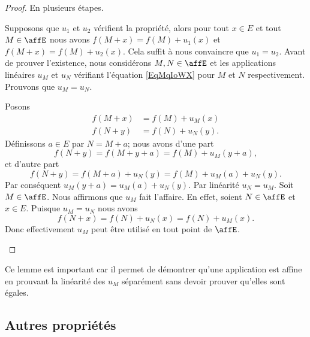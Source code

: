 \begin{proof}
	En plusieurs étapes.
	\begin{subproof}
		\spitem[Unicité]
		Supposons que \( u_1\) et \( u_2\) vérifient la propriété, alors pour tout \( x\in E\) et tout \( M\in \affE\) nous avons \( f(M+x)=f(M)+u_1(x)\) et \( f(M+x)=f(M)+u_2(x)\). Cela suffit à nous convaincre que \( u_1=u_2\).
		\spitem[\( u_M=u_N\)]
		Avant de prouver l'existence, nous considérons \( M,N\in \affE\) et les applications linéaires \( u_M\) et \( u_N\) vérifiant l'équation \eqref{EqMqIoWX} pour \( M\) et \( N\) respectivement. Prouvons que \( u_M=u_N\).

		Posons
		\begin{subequations}
			\begin{align}
				f(M+x) & =f(M)+u_M(x)  \\
				f(N+y) & =f(N)+u_N(y).
			\end{align}
		\end{subequations}
		Définissons \( a\in E\) par \( N=M+a\); nous avons d'une part
		\begin{equation}
			f(N+y)=f(M+y+a)=f(M)+u_M(y+a),
		\end{equation}
		et d'autre part
		\begin{equation}
			f(N+y)=f(M+a)+u_N(y)=f(M)+u_M(a)+u_N(y).
		\end{equation}
		Par conséquent \( u_M(y+a)=u_M(a)+u_N(y)\). Par linéarité \( u_N=u_M\).
		\spitem[Existence]
		Soit \( M\in \affE\). Nous affirmons que \( u_M\) fait l'affaire. En effet, soient \( N\in \affE\) et \( x\in E\). Puisque \( u_M=u_N\) nous avons
		\begin{equation}
			f(N+x)=f(N)+u_N(x)=f(N)+u_M(x).
		\end{equation}
		Donc effectivement \( u_M\) peut être utilisé en tout point de \( \affE\).
	\end{subproof}
\end{proof}
Ce lemme est important car il permet de démontrer qu'une application est affine en prouvant la linéarité des \( u_M\) séparément sans devoir prouver qu'elles sont égales.

\subsection{Autres propriétés}


